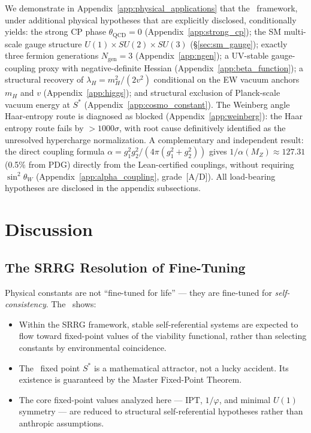 \documentclass[11pt]{article}
\theoremstyle{remark}
\newcommand{\SRRG}{\text{SRRG}}
\newcommand{\IPT}{\mathrm{IPT}}
\newcommand{\Sstar}{S^*}
\newcommand{\goldenratio}{\varphi}
\begin{document}

We demonstrate in Appendix~\ref{app:physical_applications} that the \SRRG\ framework,
under additional physical hypotheses that are explicitly disclosed, conditionally yields:
the strong CP phase $\theta_{\mathrm{QCD}} = 0$ (Appendix~\ref{app:strong_cp});
the SM multi-scale gauge structure $U(1)\times SU(2)\times SU(3)$ (§\ref{sec:sm_gauge});
exactly three fermion generations $N_{\mathrm{gen}} = 3$ (Appendix~\ref{app:ngen});
a UV-stable gauge-coupling proxy with negative-definite Hessian
(Appendix~\ref{app:beta_function});
a structural recovery of $\lambda_H = m_H^2/(2v^2)$ conditional on the EW vacuum
anchors $m_H$ and $v$ (Appendix~\ref{app:higgs});
and structural exclusion of Planck-scale vacuum energy at $\Sstar$
(Appendix~\ref{app:cosmo_constant}).
The Weinberg angle Haar-entropy route is diagnosed as blocked
(Appendix~\ref{app:weinberg}): the Haar entropy route fails by $>1000\sigma$,
with root cause definitively identified as the unresolved hypercharge normalization.
A complementary and independent result: the direct coupling formula
$\alpha = g_1^2 g_2^2/(4\pi(g_1^2+g_2^2))$ gives $1/\alpha(M_Z) \approx 127.31$
(0.5\% from PDG) directly from the Lean-certified couplings, without requiring
$\sin^2\theta_W$ (Appendix~\ref{app:alpha_coupling}, grade~[A/D]).
All load-bearing hypotheses are disclosed in the appendix subsections.

\section{Discussion}
\label{sec:discussion}

\subsection{The SRRG Resolution of Fine-Tuning}
\label{sec:fine_tuning}

Physical constants are not ``fine-tuned for life'' --- they are fine-tuned for
\emph{self-consistency}. The \SRRG\ shows:

\begin{itemize}[leftmargin=2.5em]
\item Within the SRRG framework, stable self-referential systems are expected to
  flow toward fixed-point values of the viability functional, rather than
  selecting constants by environmental coincidence.
\item The \SRRG\ fixed point $\Sstar$ is a mathematical attractor, not a lucky
  accident. Its existence is guaranteed by the Master Fixed-Point Theorem.
\item The core fixed-point values analyzed here --- $\IPT$, $1/\goldenratio$,
  and minimal $U(1)$ symmetry --- are reduced to structural self-referential
  hypotheses rather than anthropic assumptions.
\end{itemize}
\end{document}
